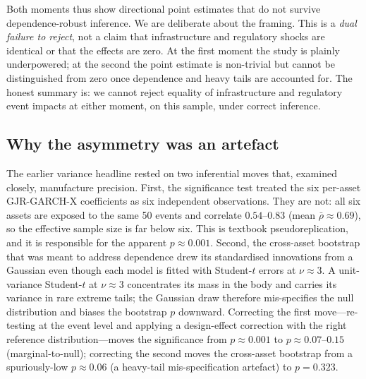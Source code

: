 \documentclass[pdflatex,sn-mathphys-num]{sn-jnl}
\theoremstyle{thmstyleone}
\theoremstyle{thmstyletwo}
\theoremstyle{thmstylethree}
\begin{document}
Both moments thus show directional point estimates that do not survive dependence-robust inference. We are deliberate about the framing. This is a \emph{dual failure to reject}, not a claim that infrastructure and regulatory shocks are identical or that the effects are zero. At the first moment the study is plainly underpowered; at the second the point estimate is non-trivial but cannot be distinguished from zero once dependence and heavy tails are accounted for. The honest summary is: we cannot reject equality of infrastructure and regulatory event impacts at either moment, on this sample, under correct inference.

\subsection{Why the asymmetry was an artefact}

The earlier variance headline rested on two inferential moves that, examined closely, manufacture precision. First, the significance test treated the six per-asset GJR-GARCH-X coefficients as six independent observations. They are not: all six assets are exposed to the same 50 events and correlate $0.54$--$0.83$ (mean $\bar\rho \approx 0.69$), so the effective sample size is far below six. This is textbook pseudoreplication, and it is responsible for the apparent $p \approx 0.001$. Second, the cross-asset bootstrap that was meant to address dependence drew its standardised innovations from a Gaussian even though each model is fitted with Student-$t$ errors at $\nu \approx 3$. A unit-variance Student-$t$ at $\nu \approx 3$ concentrates its mass in the body and carries its variance in rare extreme tails; the Gaussian draw therefore mis-specifies the null distribution and biases the bootstrap $p$ downward. Correcting the first move---re-testing at the event level and applying a design-effect correction with the right reference distribution---moves the significance from $p \approx 0.001$ to $p \approx 0.07$--$0.15$ (marginal-to-null); correcting the second moves the cross-asset bootstrap from a spuriously-low $p \approx 0.06$ (a heavy-tail mis-specification artefact) to $p = 0.323$.
\end{document}
